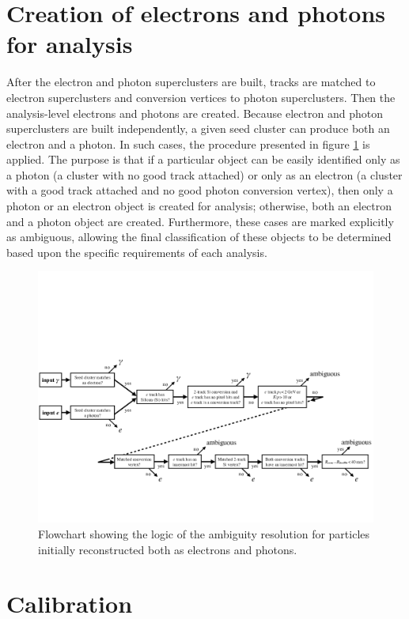 \documentclass[a4paper, oneside]{book}
\begin{document}
		\section{Creation of electrons and photons for analysis}\label{section:creation}
		\cite{El ph reco}After the electron and photon superclusters are built, tracks are matched to electron superclusters and conversion vertices to photon superclusters. Then the analysis-level
		electrons and photons are created. Because electron and photon superclusters are built independently, a given seed cluster can produce both an electron and a photon. In such cases, the procedure
		presented in figure \ref{fig:el_ph_analisi} is applied. The purpose is that if a particular object can be easily identified only as a photon (a cluster with no good track attached) or only as an electron (a cluster with a good track attached and no good photon conversion vertex), then only a photon or an electron object is created for analysis; otherwise, both an electron and a photon object are created. Furthermore, these cases are marked explicitly as ambiguous, allowing the final classification of these objects to be determined based upon the specific requirements of each analysis.
		\begin{figure}
			\centering
			\includegraphics[width=0.45\textheight]{tesi_images/el_ph_analisi.png}
			\caption{Flowchart showing the logic of the ambiguity resolution for particles initially reconstructed both as electrons and photons.}
			\label{fig:el_ph_analisi}
		\end{figure}
		\section{Calibration}\label{section:Calib}
\end{document}
